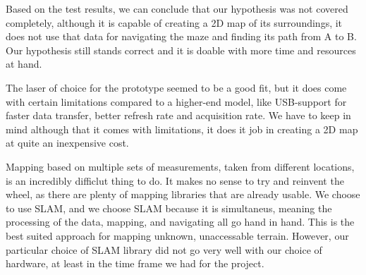 Based on the test results, we can conclude that our hypothesis was not covered completely, although it is capable of creating a 2D map of its surroundings, it does not use that data for navigating the maze and finding its path from A to B. Our hypothesis still stands correct and it is doable with more time and resources at hand.

The laser of choice for the prototype seemed to be a good fit, but it does come with certain limitations compared to a higher-end model, like USB-support for faster data transfer, better refresh rate and acquisition rate. We have to keep in mind although that it comes with limitations, it does it job in creating a 2D map at quite an inexpensive cost.

Mapping based on multiple sets of measurements, taken from different locations, is an incredibly difficlut thing to do. It makes no sense to try and reinvent the wheel, as there are plenty of mapping libraries that are already usable. We choose to use SLAM, and we choose SLAM because it is simultaneus, meaning the processing of the data, mapping, and navigating all go hand in hand. This is the best suited approach for mapping unknown, unaccessable terrain. However, our particular choice of SLAM library did not go very well with our choice of hardware, at least in the time frame we had for the project.


